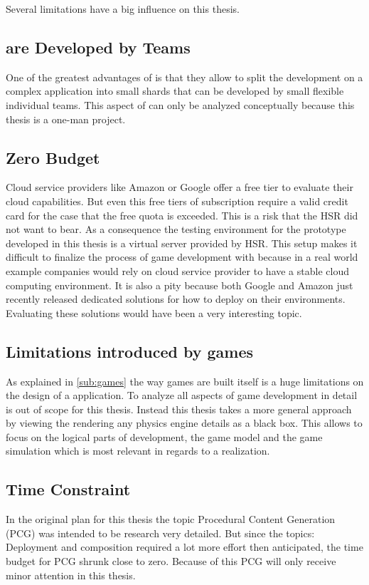 Several limitations have a big influence on this thesis. 

\subsection{\ms{} are Developed by Teams}
One of the greatest advantages of \mss{} is that they allow to split the
development on a complex application into small shards that can be developed by
small flexible individual teams. This aspect of \mss{} can only be analyzed
conceptually because this thesis is a one-man project.

\subsection{Zero Budget}
\label{sub:zero_buget}
Cloud service providers like Amazon or Google offer a free tier to evaluate
their cloud capabilities. But even this free tiers of subscription require a
valid credit card for the case that the free quota is exceeded. This is a risk
that the HSR did not want to bear. As a consequence the testing environment for
the prototype developed in this thesis is a virtual server provided by HSR. This
setup makes it difficult to finalize the process of game development with \mss{}
because in a real world example companies would rely on cloud service provider
to have a stable cloud computing environment. It is also a pity because both
Google and Amazon just recently released dedicated solutions for how to deploy
\ogs{} on their environments. Evaluating these solutions would have been a very
interesting topic.

\subsection{Limitations introduced by games}
As explained in \autoref{sub:games} the way games are built itself is a huge
limitations on the design of a \og{} application. To analyze all aspects of game
development in detail is out of scope for this thesis. Instead this thesis takes
a more general approach by viewing the rendering any physics engine details as a
black box. This allows to focus on the logical parts of \og{} development, the
game model and the game simulation which is most relevant in regards to a \ms{}
realization.

\subsection{Time Constraint}
In the original plan for this thesis the topic Procedural Content Generation
(PCG) was intended to be research very detailed. But since the topics:
Deployment and composition required a lot more effort then anticipated, the time
budget for PCG shrunk close to zero. Because of this PCG will only receive minor
attention in this thesis. 

